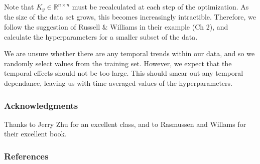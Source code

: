 \documentclass{article} %
\def\R{\mathbb R}
\begin{document}
Note that $K_y \in \R^{n \times n}$ must be recalculated at each step of the optimization.
As the size of the data set grows, this becomes increasingly intractible.
Therefore, we follow the suggestion of Russell \& Williams in their example (Ch 2), and calculate the hyperparameters for a smaller subset of the data.

We are unsure whether there are any temporal trends within our data, and so we randomly select values from the training set.
However, we expect that the temporal effects should not be too large.
This should smear out any temporal dependance, leaving us with time-averaged values of the hyperparameters.





\subsubsection*{Acknowledgments}
Thanks to Jerry Zhu for an excellent class, and to Rasmussen and Willams for their excellent book.


\subsubsection*{References}

\small{
}
\end{document}
